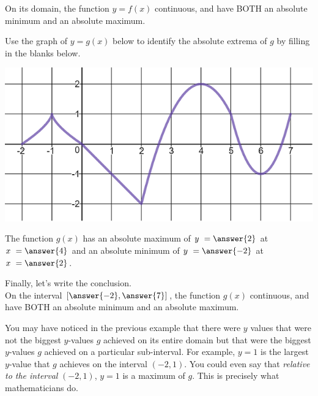 \documentclass{ximera}
\begin{document}
\begin{exercise}
\begin{exercise}
\begin{exercise}
On its domain, the function $y=f(x)$  continuous, and  have BOTH an absolute minimum and an absolute maximum.  
\end{exercise}
\end{exercise}
\end{exercise}

\begin{exercise}
Use the graph of $y = g(x)$ below to identify the absolute extrema of $g$ by filling in the blanks below. 

\begin{center} \includegraphics[scale=0.5]{extrema3new.png} \end{center}

The function $g(x)$ has an absolute maximum of $y \ = \answer{2}$ at $x \ = \answer{4}$ and an absolute minimum of $y \ = \answer{-2}$ at $x \ = \answer{2}$.

\begin{exercise}
Finally, let's write the conclusion.  \\

On the  interval $\left[ \answer{-2}, \answer{7}\right]$, the function $g(x)$  continuous, and  have BOTH an absolute minimum and an absolute maximum. 
\end{exercise}
\end{exercise}

You may have noticed in the previous example that there were $y$ values that were not the biggest $y$-values $g$ achieved on its entire domain but that were the biggest $y$-values $g$ achieved on a particular sub-interval.  For example, $y=1$ is the largest $y$-value that $g$ achieves on the interval $(-2, 1)$.  You could even say that \textit{relative to the interval} $(-2,1)$, $y=1$ is a maximum of $g$.  This is precisely what mathematicians do. 
\end{document}
